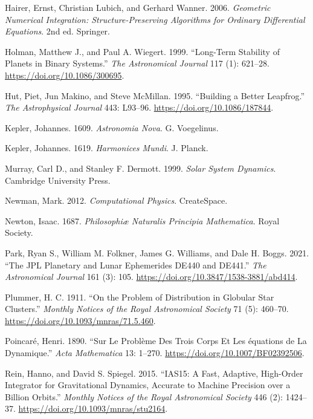 \documentclass[
  10.5pt,
  letterpaper,
]{scrbook}
\newlength{\cslhangindent}
\newenvironment{CSLReferences}[2] %
 {\begin{list}{}{%
  \setlength{\itemindent}{0pt}
  \setlength{\leftmargin}{0pt}
  \setlength{\parsep}{0pt}
  \ifodd #1
   \setlength{\leftmargin}{\cslhangindent}
   \setlength{\itemindent}{-1\cslhangindent}
  \fi
  \setlength{\itemsep}{#2\baselineskip}}}
 {\end{list}}
\theoremstyle{definition}
\theoremstyle{plain}
\theoremstyle{remark}
\begin{document}
\begin{CSLReferences}{1}{1}
Hairer, Ernst, Christian Lubich, and Gerhard Wanner. 2006.
\emph{Geometric Numerical Integration: Structure-Preserving Algorithms
for Ordinary Differential Equations}. 2nd ed. Springer.

Holman, Matthew J., and Paul A. Wiegert. 1999. {``Long-Term Stability of
Planets in Binary Systems.''} \emph{The Astronomical Journal} 117 (1):
621--28. \url{https://doi.org/10.1086/300695}.

Hut, Piet, Jun Makino, and Steve McMillan. 1995. {``Building a Better
Leapfrog.''} \emph{The Astrophysical Journal} 443: L93--96.
\url{https://doi.org/10.1086/187844}.

Kepler, Johannes. 1609. \emph{Astronomia Nova}. G. Voegelinus.

Kepler, Johannes. 1619. \emph{Harmonices Mundi}. J. Planck.

Murray, Carl D., and Stanley F. Dermott. 1999. \emph{Solar System
Dynamics}. Cambridge University Press.

Newman, Mark. 2012. \emph{Computational Physics}. CreateSpace.

Newton, Isaac. 1687. \emph{Philosophi{æ} Naturalis Principia
Mathematica}. Royal Society.

Park, Ryan S., William M. Folkner, James G. Williams, and Dale H. Boggs.
2021. {``The {JPL} Planetary and Lunar Ephemerides {DE440} and
{DE441}.''} \emph{The Astronomical Journal} 161 (3): 105.
\url{https://doi.org/10.3847/1538-3881/abd414}.

Plummer, H. C. 1911. {``On the Problem of Distribution in Globular Star
Clusters.''} \emph{Monthly Notices of the Royal Astronomical Society} 71
(5): 460--70. \url{https://doi.org/10.1093/mnras/71.5.460}.

Poincaré, Henri. 1890. {``Sur Le Probl{è}me Des Trois Corps Et Les
{é}quations de La Dynamique.''} \emph{Acta Mathematica} 13: 1--270.
\url{https://doi.org/10.1007/BF02392506}.

Rein, Hanno, and David S. Spiegel. 2015. {``{IAS15}: A Fast, Adaptive,
High-Order Integrator for Gravitational Dynamics, Accurate to Machine
Precision over a Billion Orbits.''} \emph{Monthly Notices of the Royal
Astronomical Society} 446 (2): 1424--37.
\url{https://doi.org/10.1093/mnras/stu2164}.


\end{CSLReferences}
\end{document}
